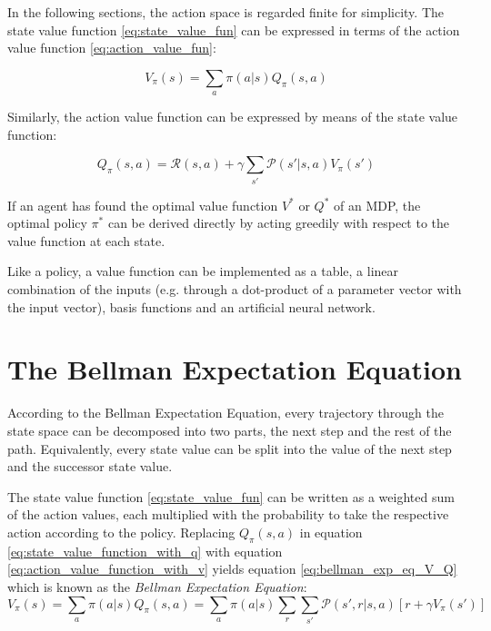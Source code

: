In the following sections, the action space is regarded finite for simplicity.
The state value function \ref{eq:state_value_fun} can be expressed in terms of the action value function \ref{eq:action_value_fun}:

\begin{equation}
V_\pi(s) = \sum_{a}\pi(a|s)Q_\pi(s,a)
\label{eq:state_value_function_with_q}
\end{equation}

Similarly, the action value function can be expressed by means of the state value function:

\begin{equation}
Q_\pi(s,a)=\mathcal{R}(s,a)+\gamma \sum_{s'}\mathcal{P}(s'|s,a)V_\pi(s')
\label{eq:action_value_function_with_v}
\end{equation}

If an agent has found the optimal value function $V^*$ or $Q^*$ of an MDP, the optimal policy $\pi^*$ can be derived directly by acting greedily with respect to the value function at each state.

Like a policy, a value function can be implemented as a table, a linear combination of the inputs (e.g. through a dot-product of a parameter vector with the input vector), basis functions and an artificial neural network.

\section{The Bellman Expectation Equation}

According to the Bellman Expectation Equation, every trajectory through the state space can be decomposed into two parts, the next step and the rest of the path. Equivalently, every state value can be split into the value of the next step and the successor state value.

The state value function \ref{eq:state_value_fun} can be written as a weighted sum of the action values, each multiplied with the probability to take the respective action according to the policy. Replacing $Q_\pi(s,a)$ in equation \ref{eq:state_value_function_with_q} with equation \ref{eq:action_value_function_with_v} yields equation \ref{eq:bellman_exp_eq_V_Q} which is known as the \textit{Bellman Expectation Equation}:
\begin{equation}
V_\pi(s)=\sum_a \pi(a|s)Q_\pi(s,a) = \sum_a \pi(a|s)\sum_r \sum_{s'} \mathcal{P}(s',r|s,a)[r+\gamma V_{\pi}(s')]
\label{eq:bellman_exp_eq_V_Q}
\end{equation}

